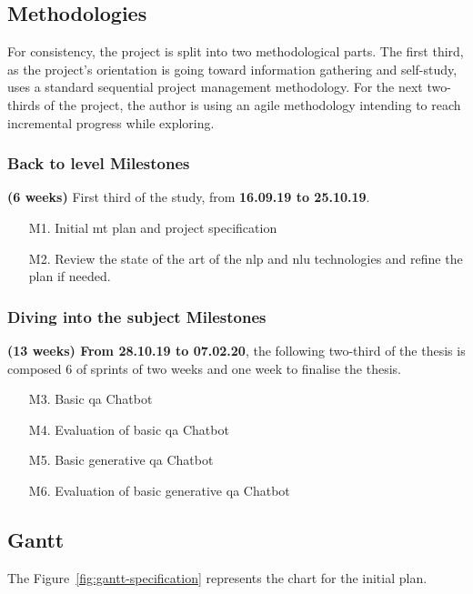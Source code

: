 \subsection*{Methodologies}
For consistency, the project is split into two methodological parts. The first third, as the project's orientation is going toward information gathering and self-study, uses a standard sequential project management methodology. For the next two-thirds of the project, the author is using an agile methodology intending to reach incremental progress while exploring.

\subsubsection*{Back to level Milestones}
\textbf{(6 weeks)} First third of the study, from \textbf{16.09.19 to 25.10.19}.
\begin{enumerate}
    \setlength\itemsep{0em}
    \item[M1.] Initial \gls{mt} plan and project specification
    \item[M2.] Review the state of the art of the \gls{nlp} and \gls{nlu} technologies and refine the plan if needed.
\end{enumerate}


\subsubsection*{Diving into the subject Milestones}
\textbf{(13 weeks) From 28.10.19 to 07.02.20}, the following two-third of the thesis is composed 6 of sprints of two weeks and one week to finalise the thesis.
\begin{itemize}
    \setlength\itemsep{0em}
    \item[M3.] Basic \gls{qa} Chatbot
    \item[M4.] Evaluation of basic \gls{qa} Chatbot
    \item[M5.] Basic generative \gls{qa} Chatbot
    \item[M6.] Evaluation of basic generative \gls{qa} Chatbot
\end{itemize}

\subsection*{Gantt}
The Figure~\ref{fig:gantt-specification} represents the chart for the initial plan.


